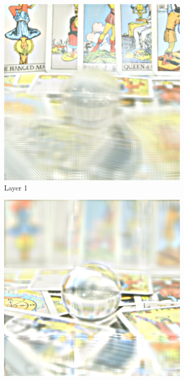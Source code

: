 \begin{figure}[tb]
\begin{subfigure}{0.23\textwidth}
		\includegraphics[width = \textwidth]{../Figures/tiling/tarot_tiles5x5x200x200_overlap0.5_3_layers/1.png}
		\caption{Layer 1}
	\end{subfigure}\hspace{0.15cm}%
	\begin{subfigure}{0.23\textwidth}
		\includegraphics[width = \textwidth]{../Figures/tiling/tarot_tiles3x3x200x200_no_overlap_3_layers/2.png}
		

\end{subfigure}
\end{figure}
